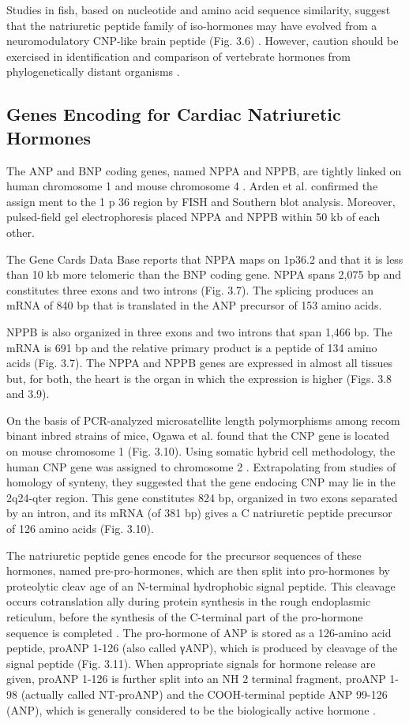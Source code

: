 \documentclass[14pt,a4paper,onecolumn]{extarticle}
\begin{document}
Studies in fish, based on nucleotide and amino acid sequence similarity, suggest that the natriuretic peptide family of iso-hormones may have evolved from a neuromodulatory CNP-like brain peptide (Fig. 3.6) \citep{4}. However, caution should be exercised in identification and comparison of vertebrate hormones from phylogenetically distant organisms \citep{1}.

\subsection{Genes Encoding for Cardiac Natriuretic Hormones
}
The ANP and BNP coding genes, named NPPA and NPPB, are tightly linked on human chromosome 1 and mouse chromosome 4 \citep{7} \citep{8}. Arden et al. \citep{7} confirmed the assign ment to the 1 p 36 region by FISH and Southern blot analysis. Moreover, pulsed-field gel electrophoresis placed NPPA and NPPB within 50 kb of each other.

The Gene Cards Data Base reports that NPPA maps on 1p36.2 and that it is less than 10 kb more telomeric than the BNP coding gene. NPPA spans 2,075 bp and constitutes three exons and two introns (Fig. 3.7). The splicing produces an mRNA of 840 bp that is translated in the ANP precursor of 153 amino acids.

NPPB is also organized in three exons and two introns that span 1,466 bp. The mRNA is 691 bp and the relative primary product is a peptide of 134 amino acids (Fig. 3.7).  The NPPA and NPPB genes are expressed in almost all tissues but, for both, the heart is the organ in which the expression is higher (Figs. 3.8 and 3.9).

On the basis of PCR-analyzed microsatellite length polymorphisms among recom binant inbred strains of mice, Ogawa et al. \citep{10} found that the CNP gene is located on mouse chromosome 1 (Fig. 3.10). Using somatic hybrid cell methodology, the human CNP gene was assigned to chromosome 2 \citep{10}. Extrapolating from studies of homology of synteny, they suggested that the gene endocing CNP may lie in the 2q24-qter region.  This gene constitutes 824 bp, organized in two exons separated by an intron, and its mRNA (of 381 bp) gives a C natriuretic peptide precursor of 126 amino acids (Fig. 3.10).

The natriuretic peptide genes encode for the precursor sequences of these hormones, named pre-pro-hormones, which are then split into pro-hormones by proteolytic cleav age of an N-terminal hydrophobic signal peptide. This cleavage occurs cotranslation ally during protein synthesis in the rough endoplasmic reticulum, before the synthesis of the C-terminal part of the pro-hormone sequence is completed \citep{11} \citep{12} \citep{13}.  The pro-hormone of ANP is stored as a 126-amino acid peptide, proANP 1-126 (also called γANP), which is produced by cleavage of the signal peptide (Fig. 3.11). When appropriate signals for hormone release are given, proANP 1-126 is further split into an NH 2 terminal fragment, proANP 1-98 (actually called NT-proANP) and the COOH-terminal peptide ANP 99-126 (ANP), which is generally considered to be the biologically active hormone \citep{11} \citep{12} \citep{13}.
\end{document}
